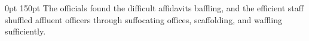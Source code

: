 \documentclass{article}
\begin{document}
 0pt 150pt The officials found the difficult affidavits baffling, and the efficient staff shuffled affluent officers through suffocating offices, scaffolding, and waffling sufficiently.
\end{document}
